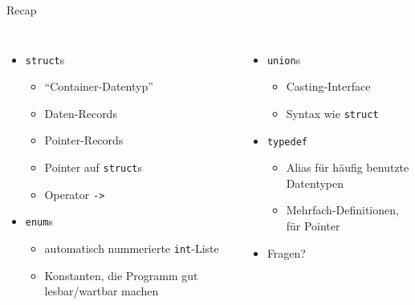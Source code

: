 
\begin{frame}[t,plain]
\titlepage
\end{frame}


\begin{frame}{Recap}
%
\begin{columns}[T]
\begin{itemize}
\item \texttt{struct}s
	\begin{itemize}
	\item \enquote{Container-Datentyp}
	\item Daten-Records
	\item Pointer-Records
	\item Pointer auf \texttt{struct}s
	\item Operator \texttt{->}
	\end{itemize}
\item \texttt{enum}s
	\begin{itemize}
	\item automatisch nummerierte \texttt{int}-Liste
	\item Konstanten, die Programm gut lesbar/wartbar machen
	\end{itemize}
\end{itemize}
%
\begin{itemize}
\item \texttt{union}s
	\begin{itemize}
	\item Casting-Interface
	\item Syntax wie \texttt{struct}
	\end{itemize}
\item \texttt{typedef}
	\begin{itemize}
	\item Alias für häufig benutzte Datentypen
	\item Mehrfach-Definitionen, \zB für Pointer
	\end{itemize}
\item Fragen?
\end{itemize}
\end{columns}

%
\end{frame}

